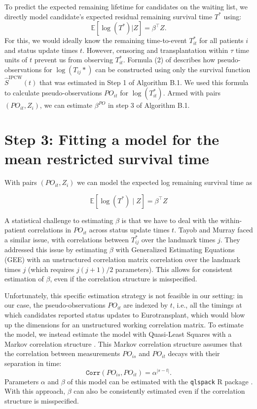 \documentclass[11pt,twoside,]{book}
\begin{document}
To predict the expected remaining lifetime for candidates on the waiting list,
we directly model candidate's expected residual remaining survival time \(T^{*}\) using:
\[\mathbb{E}[\log(T^*)|Z] = \beta^\intercal Z.\] For this, we
would ideally know the remaining time-to-event \(T^*_{it}\) for
all patients \(i\) and status update times \(t\). However, censoring and
transplantation within \(\tau\) time units of \(t\) prevent us from
observing \(T^*_{it}\). Formula (2) of \citet{tayobstatistical2017} describes
how pseudo-observations for \(\log(T_{ij}*)\) can be constructed using
only the survival function \(\hat{S}^{\text{IPCW}}(t)\)
that was estimated in Step 1 of Algorithm B.1.
We used this formula to calculate pseudo-observations \(PO_{it}\) for
\(\log(T^*_{it})\). Armed with pairs \((PO_{it}, Z_i)\), we can
estimate \(\beta^{PO}\) in step 3 of Algorithm B.1.
\newpage

\section{Step 3: Fitting a model for the mean restricted survival time}\label{step-3-fitting-a-model-for-the-mean-restricted-survival-time}

With pairs \((PO_{it}, Z_i)\) we can model the expected log remaining
survival time as

\[
\mathbb{E}[\log(T^*) \mid Z] = \beta^\intercal Z
\tag{B.1}
\]

A statistical challenge to estimating \(\beta\) is that we have
to deal with the within-patient correlations in \(PO_{it}\) across
status update times \(t\). Tayob and Murray
faced a similar issue, with correlations between \(T^*_{ij}\)
over the landmark times \(j\). They addressed this issue by estimating
\(\beta\) with Generalized Estimating Equations (GEE) with an unstructured
correlation matrix correlation over the landmark times \(j\) (which
requires \(j(j+1)/2\) parameters). This allows for consistent estimation of
\(\beta\), even if the correlation structure is misspecified.

Unfortunately, this specific estimation strategy is not feasible in our setting: in our case, the pseudo-observations \(PO_{it}\)
are indexed by \(t\), i.e., all the timings at which candidates reported status
updates to Eurotransplant, which would blow up the dimensions
for an unstructured working correlation matrix. To
estimate the model, we instead estimate
the model with Quasi-Least Squares with a Markov correlation structure \citep{Shults2014-di}. This Markov correlation
structure assumes that the correlation between measurements
\(PO_{is}\) and \(PO_{it}\) decays with their separation in time:
\[\texttt{Corr}(PO_{is}, PO_{it}) = \alpha^{|s-t|}.\] Parameters
\(\alpha\) and \(\beta\) of this model can be estimated with the \texttt{qlspack} R
package \citep{xieqls2010}. With this approach, \(\beta\) can also
be consistently estimated even if the correlation structure is
misspecified.
\end{document}
